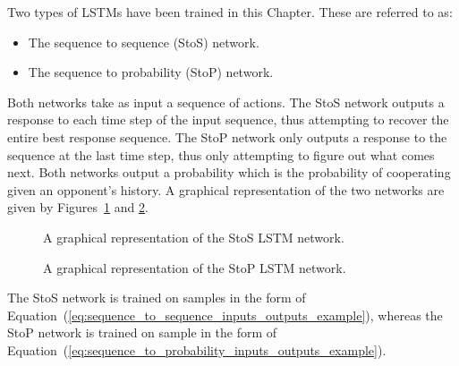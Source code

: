 Two types of LSTMs have been trained in this Chapter. These are referred to as:

\begin{itemize}
    \item The sequence to sequence (StoS) network.
    \item The sequence to probability (StoP) network.
\end{itemize}

Both networks take as input a sequence of actions. The StoS network outputs a
response to each time step of the input sequence, thus attempting to recover the entire best response sequence. The StoP network only outputs
a response to the sequence at the last time step, thus only attempting to figure out what comes next. Both networks output a
probability which is the probability of cooperating given an opponent's history.
A graphical representation of the two networks are given by
Figures~\ref{fig:sequence_to_sequence} and \ref{fig:sequence_to_probability}.

\begin{figure}[!htbp]
    \centering
    
    \caption{A graphical representation of the StoS LSTM network.}\label{fig:sequence_to_sequence}
\end{figure}

\begin{figure}[!htbp]
    \centering
    
    \caption{A graphical representation of the StoP LSTM network.}\label{fig:sequence_to_probability}
\end{figure}

The StoS network is trained on samples in the form of
Equation~(\ref{eq:sequence_to_sequence_inputs_outputs_example}), whereas the
StoP network is trained on sample in the form of
Equation~(\ref{eq:sequence_to_probability_inputs_outputs_example}).

